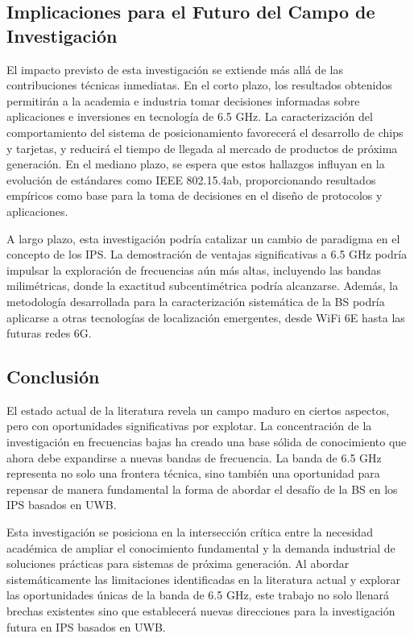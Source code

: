 \subsection{Implicaciones para el Futuro del Campo de Investigación}
\label{subsec:implicaciones_futuro}

El impacto previsto de esta investigación se extiende más allá de las contribuciones técnicas inmediatas. En el corto plazo, los resultados obtenidos permitirán a la academia e industria tomar decisiones informadas sobre aplicaciones e inversiones en tecnología de 6.5 GHz. La caracterización del comportamiento del sistema de posicionamiento favorecerá el desarrollo de chips y tarjetas, y reducirá el tiempo de llegada al mercado de productos de próxima generación. En el mediano plazo, se espera que estos hallazgos influyan en la evolución de estándares como IEEE 802.15.4ab, proporcionando resultados empíricos como base para la toma de decisiones en el diseño de protocolos y aplicaciones.

A largo plazo, esta investigación podría catalizar un cambio de paradigma en el concepto de los IPS. La demostración de ventajas significativas a 6.5 GHz podría impulsar la exploración de frecuencias aún más altas, incluyendo las bandas milimétricas, donde la exactitud subcentimétrica podría alcanzarse. Además, la metodología desarrollada para la caracterización sistemática de la BS podría aplicarse a otras tecnologías de localización emergentes, desde WiFi 6E hasta las futuras redes 6G.

\subsection{Conclusión}
\label{subsec:conclusion_analisis}

El estado actual de la literatura revela un campo maduro en ciertos aspectos, pero con oportunidades significativas por explotar. La concentración de la investigación en frecuencias bajas ha creado una base sólida de conocimiento que ahora debe expandirse a nuevas bandas de frecuencia. La banda de 6.5 GHz representa no solo una frontera técnica, sino también una oportunidad para repensar de manera fundamental la forma de abordar el desafío de la BS en los IPS basados en UWB. 

Esta investigación se posiciona en la intersección crítica entre la necesidad académica de ampliar el conocimiento fundamental y la demanda industrial de soluciones prácticas para sistemas de próxima generación. Al abordar sistemáticamente las limitaciones identificadas en la literatura actual y explorar las oportunidades únicas de la banda de 6.5 GHz, este trabajo no solo llenará brechas existentes sino que establecerá nuevas direcciones para la investigación futura en IPS basados en UWB.

